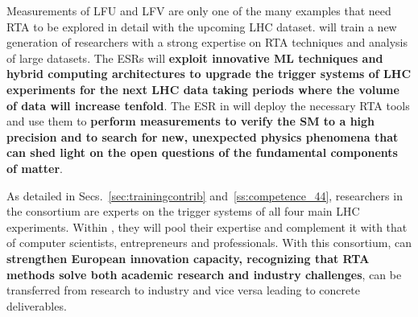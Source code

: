 Measurements of LFU and LFV are only one of the many examples that need RTA to be explored in detail with the upcoming LHC dataset. 
\acronym will train a new generation of researchers with a strong expertise on RTA techniques and analysis of large datasets. 
The ESRs will \textbf{exploit innovative ML techniques and hybrid computing architectures to upgrade the trigger systems of LHC experiments for the next LHC data taking periods where the volume of data will increase tenfold}. 
The ESR in \acronym will deploy the necessary RTA tools and use them to \textbf{perform measurements to verify the SM to a high precision and to search for new, unexpected physics phenomena that can shed light on the open questions of the fundamental components of matter}. 

As detailed in Secs.~\ref{sec:trainingcontrib} and~\ref{ss:competence_44}, researchers in the \acronym consortium are experts on the trigger systems of all four main LHC experiments. 
Within \acronym, they will pool their expertise and complement it with that of computer scientists, entrepreneurs and professionals. 
With this consortium, \acronym can \textbf{strengthen European innovation capacity, recognizing that RTA methods solve both academic research and industry challenges}, can be transferred from research to industry and vice versa leading to concrete deliverables.

